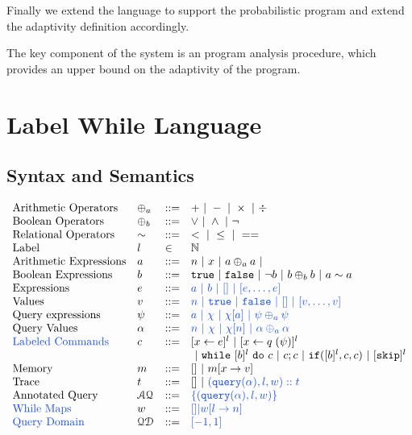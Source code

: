 \documentclass[a4paper,11pt]{article}
\begin{document}
Finally we extend the language to support the probabilistic program and extend the adaptivity definition accordingly.


The key component of the system is an program analysis procedure, which provides an upper bound on the adaptivity of the program.

\section{Label While Language}
\label{sec:while_language}
%
\subsection{Syntax and Semantics}
%
\[
\begin{array}{llll}
 \mbox{Arithmetic Operators} & \oplus_a & ::= & + ~|~ - ~|~ \times 
%
~|~ \div \\  
  \mbox{Boolean Operators} & \oplus_b & ::= & \lor ~|~ \land ~|~ \neg\\
   \mbox{Relational Operators} & \sim & ::= & < ~|~ \leq ~|~ == \\  
   \mbox{Label} & l & \in &  \mathbb{N}  \\  
\mbox{Arithmetic Expressions} & \aexpr & ::= & 
	n ~|~ x ~|~ \aexpr \oplus_a \aexpr ~|~ \\
\mbox{Boolean Expressions} & \bexpr & ::= & 
	\etrue ~|~ \efalse  ~|~ \neg \bexpr
	 ~|~ \bexpr \oplus_b \bexpr
	~|~ \aexpr \sim \aexpr \\
\mbox{Expressions } & \expr & ::= & \jl{\aexpr \sep \bexpr ~|~ [] ~|~ [\expr, \dots, \expr]} \\
\mbox{Values } & v & ::= & \jl{ n \sep \etrue \sep \efalse ~|~ [] ~|~ [v, \dots, v]}  
\\
\mbox{Query expressions} & \qexpr & ::= 
& \jl{ \aexpr ~|~ \chi ~|~ \chi[\aexpr] ~|~ \qexpr \oplus_a \qexpr} 
\\
\mbox{Query Values} & \qval & ::= 
& \jl{ n ~|~ \chi ~|~ \chi[n] ~|~ \qval \oplus_a  \qval }
\\
\mbox{\jl{Labeled Commands}} & c & ::= 
	&   [\assign x \expr]^{l} ~|~  [\assign x q(\qexpr)]^{l}
	\\
 	& & & ~|~  \ewhile ~ [b]^l ~ \edo ~ c  ~|~ c;c  ~|~ \eif([\bexpr]^l, c, c) 	 ~|~ [\eskip]^{l} 
 \\
\mbox{Memory} & m & ::= & [] ~|~ m[x \to v] \\
\mbox{Trace} & t & ::= & [] 
~|~ \jl{{( \query(\qval), l, w) :: t}} \\
%
\mbox{Annotated Query} & \mathcal{AQ}  & 
::= & \jl{\{( \query(\qval), l, w) \} } 
\\
%
\mbox{\jl{While Maps}}
& w & ::= & \jl{[] |  w[l \to n]}
\\
%
\mbox{\jl{Query Domain}}
& \qdom & ::= & \jl{[-1,1]}
\end{array}
\]
%
%
\end{document}
